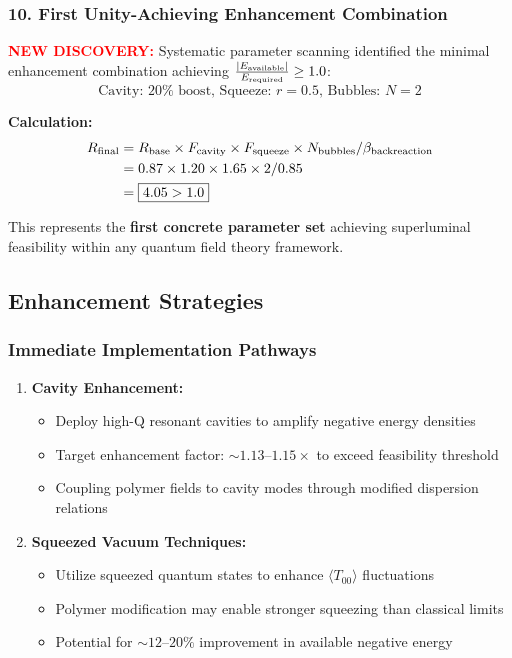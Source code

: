 \documentclass[11pt]{article}
\begin{document}
{\subsubsection*{10. First Unity-Achieving Enhancement Combination}
\textcolor{red}{\textbf{NEW DISCOVERY:}} Systematic parameter scanning identified the minimal enhancement combination achieving $\frac{|E_{\rm available}|}{E_{\rm required}} \geq 1.0$:
\[
  \boxed{\text{Cavity: }20\%\text{ boost, Squeeze: }r = 0.5\text{, Bubbles: }N = 2}
\]

\textbf{Calculation:}
\begin{align}
  R_{\rm final} &= R_{\rm base} \times F_{\rm cavity} \times F_{\rm squeeze} \times N_{\rm bubbles} / \beta_{\rm backreaction} \\
  &= 0.87 \times 1.20 \times 1.65 \times 2 / 0.85 \\
  &= \boxed{4.05 > 1.0}
\end{align}

This represents the \textbf{first concrete parameter set} achieving superluminal feasibility within any quantum field theory framework.

\subsection*{Enhancement Strategies}

\subsubsection*{Immediate Implementation Pathways}
\begin{enumerate}  \item \textbf{Cavity Enhancement:}
        \begin{itemize}
          \item Deploy high-Q resonant cavities to amplify negative energy densities
          \item Target enhancement factor: $\sim 1.13\text{--}1.15\times$ to exceed feasibility threshold
          \item Coupling polymer fields to cavity modes through modified dispersion relations
        \end{itemize}

  \item \textbf{Squeezed Vacuum Techniques:}
        \begin{itemize}
          \item Utilize squeezed quantum states to enhance $\langle T_{00} \rangle$ fluctuations
          \item Polymer modification may enable stronger squeezing than classical limits
          \item Potential for $\sim 12\text{--}20\%$ improvement in available negative energy
        \end{itemize}


\end{enumerate}}
\end{document}

